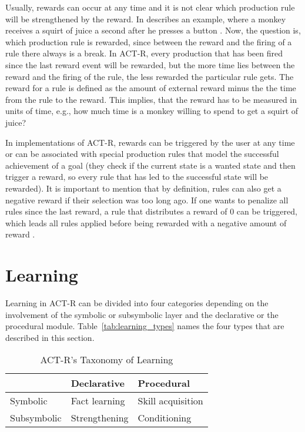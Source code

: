 Usually, rewards can occur at any time and it is not clear which production rule will be strengthened by the reward. In  \citeauthor{anderson_how_2007} describes an example, where a monkey receives a squirt of juice a second after he presses a button \cite[161]{anderson_how_2007}. Now, the question is, which production rule is rewarded, since between the reward and the firing of a rule there always is a break. In ACT-R, every production that has been fired since the last reward event will be rewarded, but the more time lies between the reward and the firing of the rule, the less rewarded the particular rule gets. The reward for a rule is defined as the amount of external reward minus the the time from the rule to the reward. This implies, that the reward has to be measured in units of time, e.g., how much time is a monkey willing to spend to get a squirt of juice? \cite[161]{anderson_how_2007}

In implementations of ACT-R, rewards can be triggered by the user at any time or can be associated with special production rules that model the successful achievement of a goal (they check if the current state is a wanted state and then trigger a reward, so every rule that has led to the successful state will be rewarded). It is important to mention that by definition, rules can also get a negative reward if their selection was too long ago. If one wants to penalize all rules since the last reward, a rule that distributes a reward of 0 can be triggered, which leads all rules applied before being rewarded with a negative amount of reward \cite[unit 6, p. 8]{actr_tutorial}.

\section{Learning}

Learning in ACT-R can be divided into four categories depending on the involvement of the symbolic or subsymbolic layer and the declarative or the procedural module. Table~\ref{tab:learning_types} names the four types that are described in this section.

\begin{table}[hbt]
\caption{ACT-R's Taxonomy of Learning \cite[92--95]{anderson_how_2007}}
\begin{center}
\begin{tabular}{|l|ll|}
\hline
 & Declarative & Procedural\\
\hline
Symbolic & Fact learning & Skill acquisition\\
Subsymbolic & Strengthening & Conditioning\\
\hline
\end{tabular}
\end{center}
\end{table}


